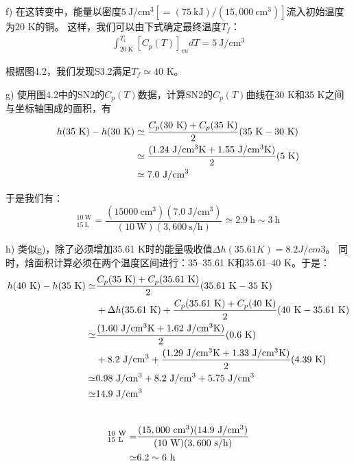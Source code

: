 f) 在这转变中，能量以密度$5\ \mathrm{J/cm^3}[= (75\ \mathrm{kJ})/(15,000\ \mathrm{cm^3})]$流入初始温度为20 K的铜。
这样，我们可以由下式确定最终温度$T_f$：
\begin{align*}%
\int_{20\ \mathrm{K}}^{T_i}[C_p(T)]_{cu}dT=5\ \mathrm{J/cm^3} \tag{S3.2}
\end{align*}

根据图4.2，我们发现S3.2满足$T_f\simeq 40$ K。

g) 使用图4.2中的SN2的$C_p(T)$数据，计算SN2的$C_p(T)$曲线在30 K和35 K之间
与坐标轴围成的面积，有
\begin{align*}%
h(35\ \mathrm{K})-h(30\ \mathrm{K})&\simeq\frac{C_p(30\ \mathrm{K})+C_p(35\ \mathrm{K})}{2}(35\ \mathrm{K}-30\ \mathrm{K})\\\notag
&\simeq\frac{(1.24\ \mathrm{J/cm^3 K}+1.55\ \mathrm{J/cm^3 K})}{2}(5\ \mathrm{K})\\\notag
&\simeq 7.0\ \mathrm{J/cm^3}
\end{align*}

于是我们有：
\begin{equation*}%
[\Delta t(30\ \mathrm{K} \rightarrow 35\ \mathrm{K})]_{15\ \mathrm{L}}^{10\ \mathrm{W}}=\frac{(15000\ \mathrm{cm^3})(7.0\ \mathrm{J/cm^3})}{(10\ \mathrm{W})(3,600\ \mathrm{s/h})}
\simeq 2.9\ \mathrm{h}\sim 3\ \mathrm{h}
\end{equation*}

h) 类似g)，除了必须增加35.61 K时的能量吸收值$\Delta h(35.61 K)=8.2 J/cm3$。
同时，焓面积计算必须在两个温度区间进行：35–35.61 K和35.61–40 K。于是：
\begin{align*}%
h(40\ \mathrm{K})-h(35\ \mathrm{K})\simeq&\frac{C_p(35\ \mathrm{K})+C_p(35.61\ \mathrm{K})}{2}(35.61\ \mathrm{K}-35\ \mathrm{K}) \\\notag
&+\Delta h(35.61\ \mathrm{K})+\frac{C_p(35.61\ \mathrm{K})+C_p(40\ \mathrm{K})}{2}(40\ \mathrm{K}-35.61\ \mathrm{K})\\\notag
\simeq&\frac{(1.60\ \mathrm{J/cm^3 K}+1.62\ \mathrm{J/cm^3 K})}{2}(0.6\ \mathrm{K})\\\notag
&+8.2\ \mathrm{J/cm^3}+\frac{(1.29\ \mathrm{J/cm^3 K}+1.33\ \mathrm{J/cm^3 K})}{2}(4.39\ \mathrm{K})\\\notag
\simeq&0.98\ \mathrm{J/cm^3}+8.2\ \mathrm{J/cm^3}+5.75\ \mathrm{J/cm^3}\\\notag
\simeq& 14.9\ \mathrm{J/cm^3}\\\notag
\end{align*}

\begin{align*}
[\Delta t(30\ \mathrm{K} \rightarrow 35\ \mathrm{K})]_{15\ \mathrm{L}}^{10\ \mathrm{W}}=&\frac{(15,000\ \mathrm{cm^3})(14.9\ \mathrm{J/cm^3})}{(10\ \mathrm{W})(3,600\ \mathrm{s/h})}\\\notag
\simeq&6.2\sim 6\ \mathrm{h} \notag
\end{align*}

